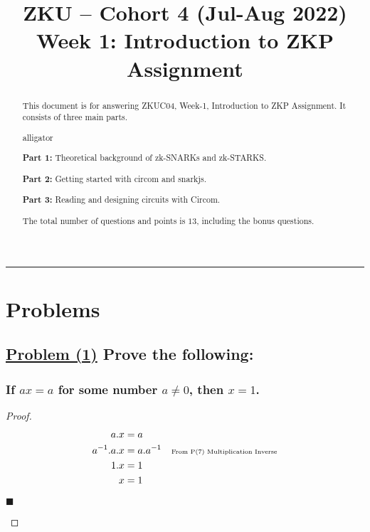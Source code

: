 \documentclass[letterpaper, 10 pt, conference]{ieeeconf}  %
\title{\LARGE \bf
ZKU – Cohort 4 (Jul-Aug 2022)\\Week 1: Introduction to ZKP\\Assignment \sharp 1}
\author{Iskander Andrews$^{1}$%
\thanks{\faIcon[regular]{envelope} \tt\small iskander.s.andrews@gmail.com}
\thanks{\faIcon{discord} \tt\small Isk#0996}
\thanks{\faIcon{github} \tt\small iskdrews}}
\begin{document}
\maketitle
\thispagestyle{empty}
\pagestyle{empty}


\begin{abstract}

This document is for answering ZKUC04, Week-1, Introduction to ZKP Assignment.
It consists of three main parts.
\begin{labeling}{alligator}
\item [\textbf{Part 1:}] Theoretical background of zk-SNARKs and zk-STARKS.
\item [\textbf{Part 2:}] Getting started with circom and snarkjs.
\item [\textbf{Part 3:}] Reading and designing circuits with Circom.
\end{labeling}

The total number of questions and points is $13$, including the bonus questions. 
\end{abstract}

\noindent\rule{8cm}{0.4pt}

\section{\textbf{Problems}}
\subsection{\textbf{\underline{Problem (1)} Prove the following:}}
\subsubsection{\textbf{If $ax = a$ for some number $a \neq 0$, then $x = 1$.}}

\renewcommand\qedsymbol{$\blacksquare$}

\begin{proof}
\begin{align}
a.x& = a && \text{}\\
a^{-1}.a.x& = a.a^{-1} && \text{\tiny{From P(7) Multiplication Inverse}}\\
1.x& = 1 && \text{}\\
x& = 1 && 
\end{align}

\begin{flushright}
$\blacksquare$
\end{flushright}
\end{proof}
\end{document}

